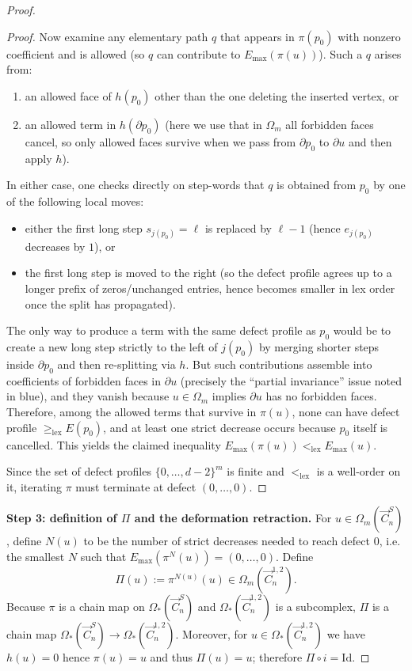 \documentclass[11pt]{amsart}
\theoremstyle{plain}
\theoremstyle{definition}
\numberwithin{equation}{section}
\begin{document}
\begin{proof}
\begin{proof}
Now examine any elementary path $q$ that appears in $\pi(p_0)$ with nonzero coefficient and is allowed
(so $q$ can contribute to $E_{\max}(\pi(u))$).  Such a $q$ arises from:
\begin{enumerate}
\item an allowed face of $h(p_0)$ other than the one deleting the inserted vertex, or
\item an allowed term in $h(\partial p_0)$ (here we use that in $\Omega_m$ all forbidden faces cancel, so only allowed faces
      survive when we pass from $\partial p_0$ to $\partial u$ and then apply $h$).
\end{enumerate}
In either case, one checks directly on step-words that $q$ is obtained from $p_0$ by one of the following local moves:
\begin{itemize}
\item either the first long step $s_{j(p_0)}=\ell$ is replaced by $\ell-1$ (hence $e_{j(p_0)}$ decreases by $1$), or
\item the first long step is moved to the right (so the defect profile agrees up to a longer prefix of zeros/unchanged
      entries, hence becomes smaller in lex order once the split has propagated).
\end{itemize}
The only way to produce a term with the same defect profile as $p_0$ would be to create a new long step strictly
to the left of $j(p_0)$ by merging shorter steps inside $\partial p_0$ and then re-splitting via $h$.
But such contributions assemble into coefficients of forbidden faces in $\partial u$ (precisely the ``partial invariance''
issue noted in blue), and they vanish because $u\in\Omega_m$ implies $\partial u$ has no forbidden faces.
Therefore, among the allowed terms that survive in $\pi(u)$, none can have defect profile $\ge_{\mathrm{lex}}E(p_0)$,
and at least one strict decrease occurs because $p_0$ itself is cancelled.  This yields the claimed inequality
$E_{\max}(\pi(u))<_{\mathrm{lex}}E_{\max}(u)$.

Since the set of defect profiles $\{0,\dots,d-2\}^m$ is finite and $<_{\mathrm{lex}}$ is a well-order on it,
iterating $\pi$ must terminate at defect $(0,\dots,0)$.
\end{proof}

\textbf{Step 3: definition of $\Pi$ and the deformation retraction.}
For $u\in\Omega_m(\vec{C}_n^S)$, define $N(u)$ to be the number of strict decreases needed to reach defect $0$, i.e.
the smallest $N$ such that $E_{\max}(\pi^N(u))=(0,\dots,0)$. Define
\[
\Pi(u):=\pi^{N(u)}(u)\in \Omega_m(\vec{C}_n^{1,2}).
\]
Because $\pi$ is a chain map on $\Omega_*(\vec{C}_n^S)$ and $\Omega_*(\vec{C}_n^{1,2})$ is a subcomplex,
$\Pi$ is a chain map $\Omega_*(\vec{C}_n^S)\to \Omega_*(\vec{C}_n^{1,2})$.
Moreover, for $u\in\Omega_*(\vec{C}_n^{1,2})$ we have $h(u)=0$ hence $\pi(u)=u$ and thus $\Pi(u)=u$; therefore
$\Pi\circ i=\mathrm{Id}$.


\end{proof}
\end{document}
